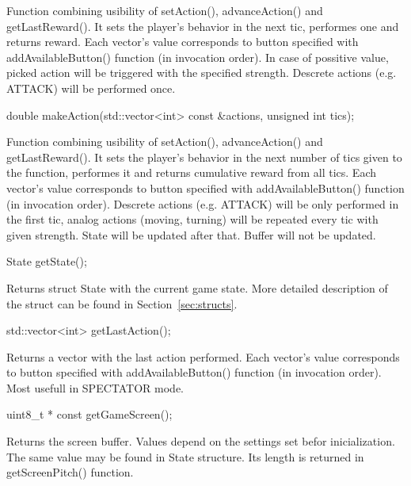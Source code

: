 Function combining usibility of setAction(), advanceAction() and getLastReward(). It sets the player's behavior in the next tic, performes one and returns reward.
Each vector's value corresponds to button specified with addAvailableButton() function (in invocation order).
In case of possitive value, picked action will be triggered with the specified strength. Descrete actions (e.g. ATTACK) will be performed once. 


\vspace{20pt}
\begin{clinee}
	double makeAction(std::vector<int> const &actions, unsigned int tics);
\end{clinee}

Function combining usibility of setAction(), advanceAction() and getLastReward(). It sets the player's behavior in the next number of tics given to the function, performes it and returns cumulative reward from all tics. Each vector's value corresponds to button specified with addAvailableButton() function (in invocation order). Descrete actions (e.g. ATTACK) will be only performed in the first tic, analog actions (moving, turning) will be repeated every tic with given strength.
State will be updated after that. Buffer will not be updated.


\vspace{20pt}
\begin{clinee}
	State getState();
\end{clinee}

Returns struct State with the current game state. More detailed description of the struct can be found in Section~\ref{sec:structs}.


\vspace{20pt}
\begin{clinee}
	std::vector<int> getLastAction();
\end{clinee}

Returns a vector with the last action performed. Each vector's value corresponds to button specified with addAvailableButton() function (in invocation order). Most usefull in SPECTATOR mode.


\vspace{20pt}
\begin{clinee}
	uint8_t * const getGameScreen();
\end{clinee}

Returns the screen buffer. Values depend on the settings set befor inicialization. The same value may be found in State structure. Its length is returned in getScreenPitch() function.


